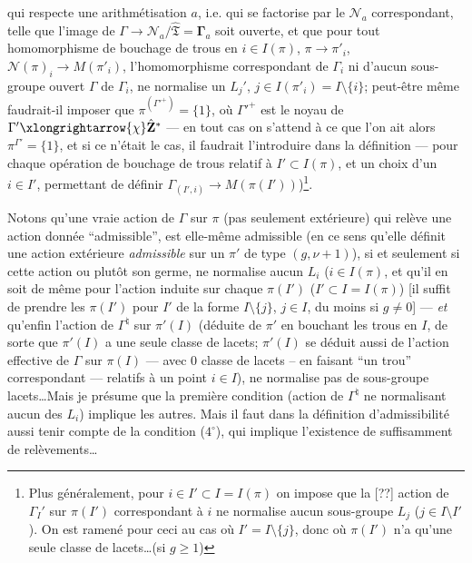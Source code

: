 qui respecte une arithmétisation $a$, i.e. qui se factorise par le $\mathcal{N}_a$ correspondant, telle que l'image de $\Gamma\to\mathcal{N}_a/\hat{\mathfrak{T}}=\boldsymbol{\Gamma}_a$ soit ouverte, et que pour tout homomorphisme de bouchage de trous en $i\in I(\pi)$, $\pi\to\pi'_i$, $\mathcal{N}(\pi)_i\to M(\pi'_i)$, l'homomorphisme correspondant de $\Gamma_i$ ni d'aucun sous-groupe ouvert $\Gamma$ de $\Gamma_i$, ne normalise un $L_j'$, $j\in I(\pi'_i)=I\setminus\{i\}$; peut-être même faudrait-il imposer que $\pi^{({\Gamma'}^+)} =\{1\}$, où ${\Gamma'}^+$ est le noyau de $\Gamma'\xlongrightarrow{\chi}\hat{\mathbf{Z}}^*$ --- en tout cas on s'attend à ce que l'on ait alors $\pi^{\Gamma'}=\{1\}$, et si ce n'était le cas, il faudrait l'introduire dans la définition --- pour chaque opération de bouchage de trous relatif à $I'\subset  I(\pi)$, et un choix d'un $i\in I'$, permettant de définir $\Gamma_{(I',i)}\to M(\pi(I'))$)\footnote{Plus généralement, pour $i\in I'\subset  I=I(\pi)$ on impose que la [??] action de $\Gamma_I'$ sur $\pi(I')$ correspondant à $i$ ne normalise aucun sous-groupe $L_j$ ($j\in I\setminus I'$). On est ramené pour ceci au cas où $I'=I\setminus\{j\}$, donc où $\pi(I')$ n'a qu'une seule classe de lacets\dots (si $g\ge 1$)}.

Notons qu'une vraie action de $\Gamma$ sur $\pi$ (pas seulement extérieure) qui relève une action donnée ``admissible'', est elle-même admissible (en ce sens qu'elle définit une action extérieure \emph{admissible} sur un $\pi'$ de type $(g,\nu+1)$), si et seulement si cette action ou plutôt son germe, ne normalise aucun $L_i$ ($i\in I(\pi)$, et qu'il en soit de même pour l'action induite sur chaque $\pi(I')$ ($I'\subset  I=I(\pi)$) [il suffit de prendre les $\pi(I')$ pour $I'$ de la forme $I\setminus \{j\}$, $j\in I$, du moins si $g\ne 0$] --- \emph{et} qu'enfin l'action de $\Gamma^\natural$ sur $\pi'(I)$ (déduite de $\pi'$ en bouchant les trous en $I$, de sorte que $\pi'(I)$ a une seule classe de lacets; $\pi'(I)$ se déduit aussi de l'action effective de $\Gamma$ sur $\pi(I)$ --- avec 0 classe de lacets -- en faisant ``un trou'' correspondant --- relatifs à un point $i\in I$), ne normalise pas de sous-groupe lacets\dots Mais je présume que la première condition (action de $\Gamma^\natural$ ne normalisant aucun des $L_i$) implique les autres. Mais il faut dans la définition d'admissibilité aussi tenir compte de la condition ($4^\circ$), qui implique l'existence de suffisamment de relèvements\dots

